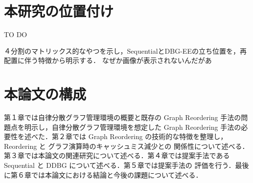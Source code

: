 \section{本研究の位置付け}
TO DO

４分割のマトリックス的なやつを示し，SequentialとDBG-EEの立ち位置を，再配置に伴う特徴から明示する．
なぜか画像が表示されないんだがあ

\section{本論文の構成}
第１章では自律分散グラフ管理環境の概要と既存の Graph Reordering 手法の問題点を明示し，自律分散グラフ管理環境を想定した
Graph Reordering 手法の必要性を述べた．第２章では Graph Reordering の技術的な特徴を整理し，Reordering と グラフ演算時のキャッシュミス減少との
関係性について述べる．第３章では本論文の関連研究について述べる．第４章では提案手法である Sequential と DDBG について述べる．第５章では提案手法の
評価を行う．最後に第６章では本論文における結論と今後の課題について述べる．